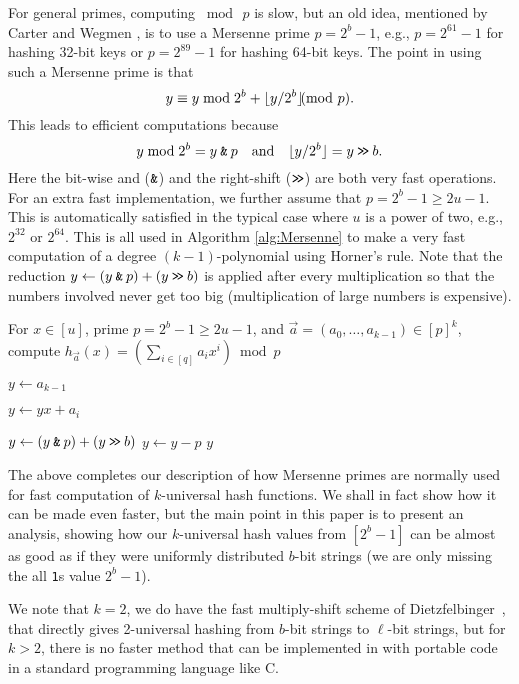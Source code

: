 For general primes, computing $\bmod\,p$ is slow, but an old idea,
mentioned by Carter and Wegmen \cite{carter77universal}, is to use a
Mersenne prime $p=2^b-1$, e.g., $p=2^{61}-1$ for hashing 32-bit keys or
$p=2^{89}-1$ for hashing 64-bit keys. The point in using such a Mersenne prime
is that
\begin{equation}\label{eq:Mersenne}
   y\equiv y\bmod 2^{b}+\floor{y/2^b}\ppmod {p}.
\end{equation}
This leads to efficient computations because 
\[y\bmod 2^{b}=y\mathbin{\texttt{\&}} p\quad\textnormal{and}\quad\lfloor {y/2^b} \rfloor=y\mathbin{\texttt{>\!>}} b.\]
Here the bit-wise {\sc and} ($\mathbin{\texttt{\&}}$) and the right-shift ($\mathbin{\texttt{>\!>}}$) are
both very fast operations. For
an extra fast implementation, we further assume that $p=2^b-1\geq 2u-1$.
This is automatically satisfied in the typical case where $u$ is a power
of two, e.g., $2^{32}$ or $2^{64}$. This is all used in Algorithm \ref{alg:Mersenne} to make a very fast
computation of a degree $(k-1)$-polynomial using Horner's rule. Note that
the reduction $y\gets (y\mathbin{\texttt{\&}} p)+(y \mathbin{\texttt{>\!>}} b)$ is applied after
every multiplication so that the numbers involved never get too big (multiplication of large numbers is expensive).
\begin{algorithm}\label{alg:Mersenne}
   \caption{
      For $x\in [u]$, prime $p=2^b-1\geq 2u-1$,
      and $\vec a=(a_0,\ldots,a_{k-1})\in[p]^k$,
      compute $h_{\vec a}(x)=\left(\sum_{i\in[q]}a_i x^i\right)\bmod p$
   }
   \begin{algorithmic}[1]
      \State $y\gets a_{k-1}$

      \State $y\gets yx+a_i$

      \State $y\gets (y\mathbin{\texttt{\&}} p)+(y\mathbin{\texttt{>\!>}} b)$
      \EndFor
      \State $y\gets y-p$
      \EndIf
      \State \Return $y$
   \end{algorithmic}
\end{algorithm}
The above completes our description of how Mersenne primes are
normally used for fast computation of $k$-universal hash functions.
We shall in fact show how it can be made even faster, but the main
point in this paper is to present an analysis, showing how our
$k$-universal hash values from $[2^b-1]$ can be almost as good as if
they were uniformly distributed $b$-bit strings (we are only missing
the all \texttt{1}s value $2^b-1$). 

We note that $k=2$, we do have the fast multiply-shift scheme of Dietzfelbinger~\cite{dietzfel96universal}, that directly gives 2-universal
hashing from $b$-bit strings to $\ell$-bit strings, but for $k>2$,
there is no faster method that can be implemented in with portable code
in a standard programming language like C.





